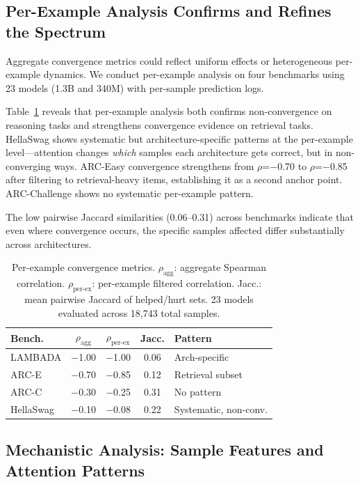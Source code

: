 \documentclass[11pt,twocolumn,a4paper]{article}
\begin{document}
\subsection{Per-Example Analysis Confirms and Refines the Spectrum}
\label{sec:per-example}

Aggregate convergence metrics could reflect uniform effects or heterogeneous per-example dynamics. We conduct per-example analysis on four benchmarks using 23 models (1.3B and 340M) with per-sample prediction logs.

Table~\ref{tab:per-example} reveals that per-example analysis both confirms non-convergence on reasoning tasks and strengthens convergence evidence on retrieval tasks. HellaSwag shows systematic but architecture-specific patterns at the per-example level---attention changes \emph{which} samples each architecture gets correct, but in non-converging ways. ARC-Easy convergence strengthens from $\rho$=$-$0.70 to $\rho$=$-$0.85 after filtering to retrieval-heavy items, establishing it as a second anchor point. ARC-Challenge shows no systematic per-example pattern.

The low pairwise Jaccard similarities (0.06--0.31) across benchmarks indicate that even where convergence occurs, the specific samples affected differ substantially across architectures.

\begin{table}[t]
\centering
\small
\begin{tabular}{lcccl}
\toprule
\textbf{Bench.} & \textbf{$\rho_{\text{agg}}$} & \textbf{$\rho_{\text{per-ex}}$} & \textbf{Jacc.} & \textbf{Pattern} \\
\midrule
LAMBADA & $-$1.00 & $-$1.00 & 0.06 & Arch-specific \\
ARC-E & $-$0.70 & $-$0.85 & 0.12 & Retrieval subset \\
ARC-C & $-$0.30 & $-$0.25 & 0.31 & No pattern \\
HellaSwag & $-$0.10 & $-$0.08 & 0.22 & Systematic, non-conv. \\
\bottomrule
\end{tabular}
\caption{Per-example convergence metrics. $\rho_{\text{agg}}$: aggregate Spearman correlation. $\rho_{\text{per-ex}}$: per-example filtered correlation. Jacc.: mean pairwise Jaccard of helped/hurt sets. 23 models evaluated across 18,743 total samples.}
\label{tab:per-example}
\end{table}

\subsection{Mechanistic Analysis: Sample Features and Attention Patterns}
\label{sec:mechanism}
\end{document}
